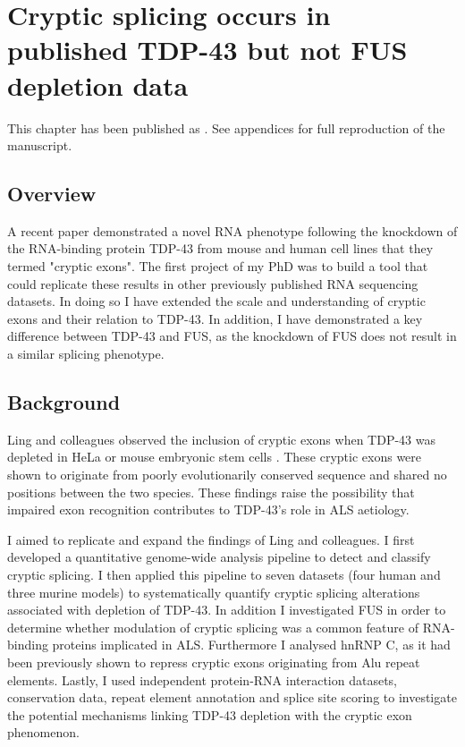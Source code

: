 \chapter{Cryptic splicing occurs in published TDP-43 but not FUS depletion data}
\label{chapter:cryptic_exons}


This chapter has been published as \citep{Humphrey2017}. See appendices for full reproduction of the manuscript.

\section{Overview}
A recent paper \citep{Ling2015} demonstrated a novel RNA phenotype following the knockdown of the RNA-binding protein TDP-43 from mouse and human cell lines that they termed "cryptic exons". The first project of my PhD was to build a tool that could replicate these results in other previously published RNA sequencing datasets. In doing so I have extended the scale and understanding of cryptic exons and their relation to TDP-43. In addition, I have demonstrated a key difference between TDP-43 and FUS, as the knockdown of FUS does not result in a similar splicing phenotype.

\section{Background}

Ling and colleagues observed the inclusion of cryptic exons when TDP-43 was depleted in HeLa or mouse embryonic stem cells \citep{Ling2015}. These cryptic exons were shown to originate from poorly evolutionarily conserved sequence and shared no positions between the two species. These findings raise the possibility that impaired exon recognition contributes to TDP-43's role in ALS aetiology.

I aimed to replicate and expand the findings of Ling and colleagues. I first developed a quantitative genome-wide analysis pipeline to detect and classify cryptic splicing. I then applied this pipeline to seven datasets (four human and three murine models) to systematically quantify cryptic splicing alterations associated with depletion of TDP-43. In addition I investigated FUS in order to determine whether modulation of cryptic splicing was a common feature of RNA-binding proteins implicated in ALS. Furthermore I analysed hnRNP C, as it had been previously shown to repress cryptic exons originating from Alu repeat elements. Lastly, I used independent protein-RNA interaction datasets, conservation data, repeat element annotation and splice site scoring to investigate the potential mechanisms linking TDP-43 depletion with the cryptic exon phenomenon.





